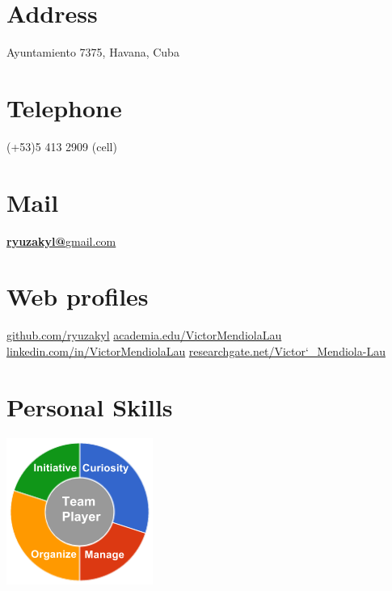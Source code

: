 \documentclass[]{friggeri-cv}
\begin{document}
      

\begin{aside}
  \section{Address}
    Ayuntamiento 7375, 
    Havana, Cuba
    ~
    ~
    ~
  \section{Telephone}
    (+53)5 413 2909 (cell)
    ~
    ~
    ~
  \section{Mail}
    \href{mailto:ryuzakyl@gmail.com}{\textbf{ryuzakyl@}gmail.com}
	~
	~    
    ~
  \section{Web profiles}
    \href{https://github.com/ryuzakyl}{{\scriptsize github.com/ryuzakyl}}
    \href{https://independent.academia.edu/VictorMendiolaLau}{{\scriptsize academia.edu/VictorMendiolaLau}}
    \href{https://www.linkedin.com/in/VictorMendiolaLau}{{\scriptsize linkedin.com/in/VictorMendiolaLau}}
	\href{https://www.researchgate.net/profile/Victor_Mendiola-Lau}{{\scriptsize researchgate.net/Victor\char`_Mendiola-Lau}}
    ~
    ~
    ~
  \section{Personal Skills}
    \includegraphics[scale=0.62]{img/personal.png}
    ~
\end{aside}
\end{document}
